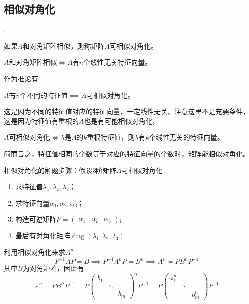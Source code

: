 \subsection{相似对角化}
.
\begin{definition}
    如果$A$和对角矩阵相似，则称矩阵$A$可相似对角化。
\end{definition}

\begin{theorem}
    $A$和对角矩阵相似$\iff A$有$n$个线性无关特征向量。
\end{theorem}
作为推论有
\begin{theorem}
    $A$有$n$个不同的特征值$\implies A$可相似对角化。
\end{theorem}
这是因为不同的特征值对应的特征向量，一定线性无关。注意这里不是充要条件，这是因为特征值有重根的$A$也是有可能相似对角化。

\begin{theorem}
    $A$可相似对角化$\iff \lambda$是$A$的$k$重根特征值，则$\lambda$有$k$个线性无关的特征向量。
\end{theorem}
简而言之，特征值相同的个数等于对应的特征向量的个数时，矩阵能相似对角化。

相似对角化的解题步骤：假设$3$阶矩阵$A$可相似对角化
\begin{enumerate}[(1)]
    \item 求特征值$\lambda_1, \lambda_2, \lambda_3$；
    \item 求特征向量$\alpha_1,\alpha_2,\alpha_3$；
    \item 构造可逆矩阵$P=\begin{pmatrix} \alpha_1 & \alpha_2& \alpha_3 \end{pmatrix}$;
    \item 最后有对角化矩阵$\operatorname{diag}(\lambda_1,\lambda_2,\lambda_3)$
\end{enumerate}

利用相似对角化来求$A^n$：
\[
    P^{-1}AP = B \implies    P^{-1}A^nP = B^n \implies A^n = PB^nP^{-1}
\]
其中$B$为对角矩阵，因此有
\begin{equation}
    A^n = PB^nP^{-1} =
    P
    \begin{pmatrix}
        b_1 &        &     \\
            & \ddots &     \\
            &        & b_m
    \end{pmatrix}^nP^{-1}
    =P
    \begin{pmatrix}
        b_1^n &        &       \\
              & \ddots &       \\
              &        & b_m^n
    \end{pmatrix}P^{-1}
\end{equation}

